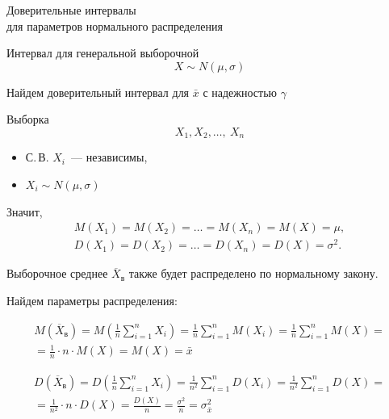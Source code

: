 \documentclass[unicode,11pt,notheorems,xcolor=table]{beamer}
\begin{document}
\begin{frame}{}{}
    \centering

    Доверительные интервалы\\ для параметров нормального распределения
   
\end{frame}
\begin{frame}[allowframebreaks]{Интервал для генеральной выборочной}{}
    $$
    X \sim N(\mu,\sigma)
    $$
    
    Найдем доверительный интервал для $\bar{x}$ с надежностью $\gamma$

    Выборка
    $$
    X_1, X_2, \ldots,~X_n
    $$
    \begin{itemize}
        \item С.\,В. $X_i$~--- независимы,
        \item $X_i\sim N(\mu,\sigma )$
    \end{itemize}
    
    Значит,
    \begin{gather*}
        M(X_1) = M(X_2) = \ldots = M(X_n) = M(X) = \mu, \\
        D(X_1) = D(X_2) = \ldots  = D(X_n) = D(X) = \sigma^2.
    \end{gather*}
    
    \framebreak
    
    Выборочное среднее  $\overline{X}_\text{в}$  также будет распределено по нормальному закону.
    
    Найдем параметры распределения:


      
    \begin{multline*}
        M(\overline{X}_\text{в}) 
        = M \left(\frac{1}{n}\sum_{i=1}^n X_i \right) 
        = \frac{1}{n}\sum_{i=1}^n M(X_i)
        = \frac{1}{n}\sum_{i=1}^n M(X)
        =\\
        = \frac{1}{n}\cdot n\cdot M(X) 
        =  M(X)
        = \bar{x}
    \end{multline*}
    \framebreak
  

    \begin{multline*}
        D(\overline{X}_\text{в})
        = D \left(\frac{1}{n}\sum_{i=1}^n X_i \right) 
        = \frac{1}{n^2}\sum_{i=1}^n D(X_i)
        = \frac{1}{n^2}\sum_{i=1}^n D(X)
        =\\
        = \frac{1}{n^2}\cdot n\cdot D(X) 
        =  \frac{D(X)}{n}
        =  \frac{\sigma^2}{n}
        = \sigma_{\bar{x}}^2
    \end{multline*}


\end{frame}
\end{document}
